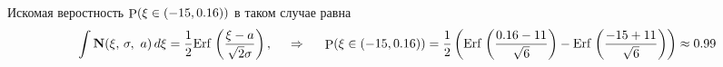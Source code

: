 Искомая веростность $\P(\xi \in (-15, 0.16))$ в таком случае равна
\begin{equation*}
    \int \mathbf N (\xi, \, \sigma, \ a) \d \xi = \frac{1}{2} \textnormal{Erf}\, \left(
        \frac{\xi-a}{\sqrt{2} \sigma}
    \right), 
    \hspace{0.5cm} \Rightarrow \hspace{0.5cm}
    \P(\xi \in (-15, 0.16)) = \frac{1}{2} \left(
        \textnormal{Erf}\, \left(
            \frac{0.16-11}{\sqrt{6}}
        \right) - \textnormal{Erf}\,
        \left(
            \frac{-15 + 11}{\sqrt{6}}
        \right)
    \right) \approx 0.99
\end{equation*}